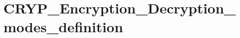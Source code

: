 \hypertarget{group___c_r_y_p___encryption___decryption__modes__definition}{\section{C\-R\-Y\-P\-\_\-\-Encryption\-\_\-\-Decryption\-\_\-modes\-\_\-definition}
\label{group___c_r_y_p___encryption___decryption__modes__definition}
}
